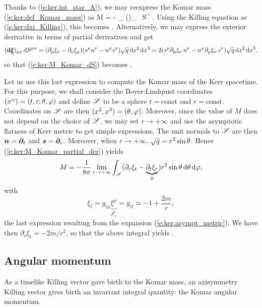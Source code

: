 Thanks to (\ref{e:ker:int_star_A}), we may reexpress the Komar mass
(\ref{e:ker:def_Komar_mass}) as
\be \label{e:ker:M_Komar_dS}
   M = - \int_{\Sp} (\dd \uu{\xi})_{\mu\nu} \,  \D S^{\mu\nu} .
\ee
Using the Killing equation as (\ref{e:ker:dxi_Killing}), this becomes
\be
     .
\ee
Alternatively, we may express the exterior derivative in terms of
partial derivatives and get
\[
    (\mathbf{d} \underline{\bm{\xi}})_{\mu\nu} \,  \mathrm{d} S^{\mu\nu} =
    (\partial_\mu \xi_\nu - \partial_\nu \xi_\mu)
    (s^\mu n^\nu - n^\mu s^\nu) \sqrt{q}\, \mathrm{d} x^2 \, \mathrm{d} x^3
    = 2 (s^\mu \partial_\mu \xi_\nu \, n^\nu - n^\mu \partial_\mu \xi_\nu \, s^\nu)
    \sqrt{q}\, \mathrm{d} x^2 \, \mathrm{d} x^3,
\]
so that (\ref{e:ker:M_Komar_dS}) becomes
\be \label{e:ker:M_Komar_partial_der}
     .
\ee

Let us use this last expression to compute the Komar mass of the Kerr
spacetime. For this purpose, we shall consider the Boyer-Lindquist coordinates
$(x^\alpha) = (t,r,\theta,\varphi)$ and define $\mathscr{S}$ to be a sphere
$t=\mathrm{const}$ and $r=\mathrm{const}$. Coordinates on $\mathscr{S}$ are then
$(x^2,x^3)=(\theta,\varphi)$. Moreover, since the value of $M$ does not depend on
the choice of $\mathscr{S}$, we may set $r\rightarrow +\infty$ and use the
asymptotic flatness of Kerr metric to get simple expressions. The unit normals
to $\mathscr{S}$ are then $\bm{n} = \bm{\partial}_t$ and $\bm{s} = \bm{\partial}_r$. Moreover, when
$r\rightarrow +\infty$, $\sqrt{q} = r^2\sin\theta$. Hence (\ref{e:ker:M_Komar_partial_der})
yields
\[
    M = -\frac{1}{8\pi} \lim_{r\rightarrow +\infty}
        \int_{\mathscr{S}}
        (\partial_r \xi_t - \underbrace{\partial_t \xi_r}_{0} )
        r^2\sin\theta \, \mathrm{d}\theta\, \mathrm{d}\varphi ,
\]
with
\[
    \xi_t = g_{t\mu} \underbrace{\xi^\mu}_{\delta^\mu_{\ \, t}}
        = g_{tt} \simeq - 1 + \frac{2m}{r} ,
\]
the last expression resulting from the expansion (\ref{e:ker:asympt_metric}).
We have then $\partial_r \xi_t = -2m/r^2$, so that the above integral yields
\be
     .
\ee


\subsection{Angular momentum} \label{s:ker:Komar_J}

As a timelike Killing vector gave birth to the Komar mass,
an axisymmetry Killing vector gives birth an invariant integral quantity:
the Komar angular momentum.

